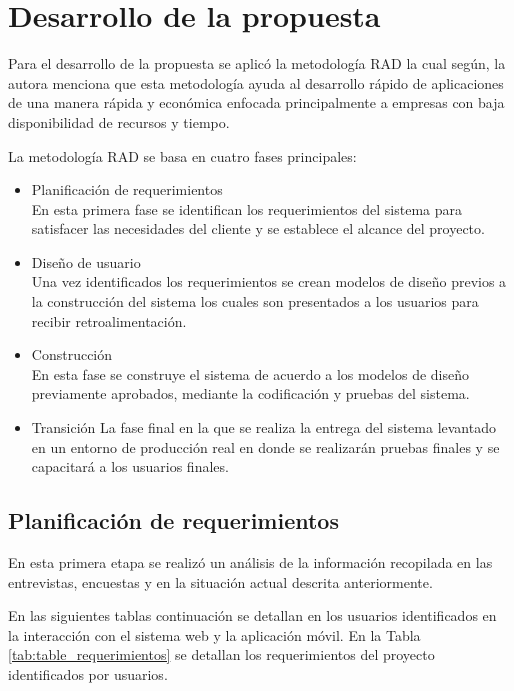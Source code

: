 \section{Desarrollo de la propuesta}\label{sec:desarrollo-propuesta}

Para el desarrollo de la propuesta se aplicó la metodología RAD la cual según\cite{bonilla_cadena_desarrollo_2022}, la autora menciona que esta metodología ayuda al desarrollo rápido de aplicaciones de una manera rápida y económica enfocada principalmente a empresas con baja disponibilidad de recursos y tiempo.

La metodología RAD se basa en cuatro fases principales:

\begin{itemize}
    \item Planificación de requerimientos \\
    En esta primera fase se identifican los requerimientos del sistema para satisfacer las necesidades del cliente y se establece el alcance del proyecto.
    \item Diseño de usuario\\
    Una vez identificados los requerimientos se crean modelos de diseño previos a la construcción del sistema los cuales son presentados a los usuarios para recibir retroalimentación.
    \item Construcción\\
    En esta fase se construye el sistema de acuerdo a los modelos de diseño previamente aprobados, mediante la codificación y pruebas del sistema.
    \item Transición
    La fase final en la que se realiza la entrega del sistema levantado en un entorno de producción real en donde se realizarán pruebas finales y se capacitará a los usuarios finales.
\end{itemize}

\subsection{Planificación de requerimientos} \label{subsec:planificacion-requerimientos}

En esta primera etapa se realizó un análisis de la información recopilada en las entrevistas, encuestas y en la situación actual descrita anteriormente.

En las siguientes tablas continuación se detallan en los usuarios identificados en la interacción con el sistema web y la aplicación móvil.
En la Tabla \ref{tab:table_requerimientos} se detallan los requerimientos del proyecto identificados por usuarios.

